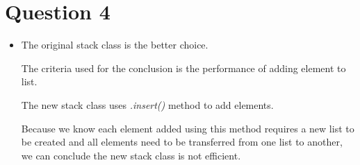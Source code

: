 \documentclass[12pt]{article}
\begin{document}
\section*{Question 4}
\begin{itemize}
    \item

    The original stack class is the better choice.

    \bigskip

    The criteria used for the conclusion is the performance of adding element
    to list.

    \bigskip

    The new stack class uses \textit{.insert()} method to add
    elements.

    \bigskip

    Because we know each element added using this method requires a new list to
    be created and all elements need to be transferred from one list to another,
    we can conclude the new stack class is not efficient.

\end{itemize}
\end{document}
